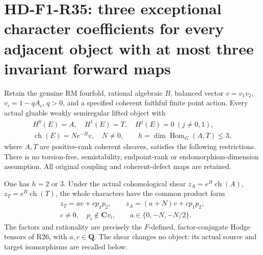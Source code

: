 \section[HD-F1-R35: unrestricted endpoint ranks at small forward Hom]{HD-F1-R35: three exceptional character coefficients for every adjacent object with at most three invariant forward maps}
\label{sec:followup-rm-unrestricted-low-h-character}

Retain the genuine RM fourfold, rational algebraic $B$,
balanced vector $v=v_1v_2$, $v_i=1-qA_i$, $q>0$,
and a specified coherent faithful finite point action.
Every actual gluable weakly semiregular lifted object with
\[
 \begin{gathered}
 H^0(E)=A,\quad H^1(E)=T,\quad H^j(E)=0\ (j\ne0,1),\\
 \operatorname{ch}(E)=Ne^{-B}v,\quad N\ne0,\qquad
 h=\dim\operatorname{Hom}_G(A,T)\le3,
 \end{gathered}
 \tag{F1R35.1}
\]
where $A,T$ are positive-rank coherent sheaves, satisfies
the following restrictions. There is no torsion-free,
semistability, endpoint-rank or endomorphism-dimension
assumption. All original coupling and coherent-defect
maps are retained.

One has $h=2$ or $3$. Under the actual cohomological
shear $z_A=e^B\operatorname{ch}(A)$,
$z_T=e^B\operatorname{ch}(T)$, the whole characters have
the common product form
\[
 \begin{gathered}
 z_T=a v+c p_1p_2,\qquad z_A=(a+N)v+c p_1p_2,\\
 c\ne0,\quad p_i\notin\mathbf C v_i,\qquad
 a\in\{0,-N,-N/2\}.
 \end{gathered}
 \tag{F1R35.2}
\]
The factors and rationality are precisely the $F$-defined,
factor-conjugate Hodge tensors of R26, with $a,c\in\mathbf Q$.
The shear changes no object: its actual source and target
isomorphisms are recalled below.

